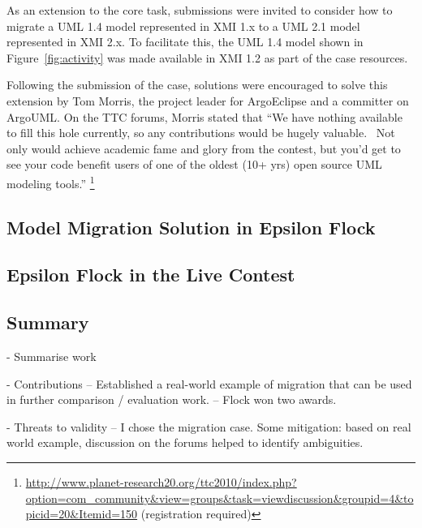 As an extension to the core task, submissions were invited to consider how to migrate a UML 1.4 model represented in XMI 1.x to a UML 2.1 model represented in XMI 2.x. To facilitate this, the UML 1.4 model shown in Figure~\ref{fig:activity} was made available in XMI 1.2 as part of the case resources.

Following the submission of the case, solutions were encouraged to solve this extension by Tom Morris, the project leader for ArgoEclipse and a committer on ArgoUML. On the TTC forums, Morris stated that ``We have nothing available to fill this hole currently, so any contributions would be hugely valuable.  Not only would achieve academic fame and glory from the contest, but you'd get to see your code benefit users of one of the oldest (10+ yrs) open source UML modeling tools.'' \footnote{\url{http://www.planet-research20.org/ttc2010/index.php?option=com_community&view=groups&task=viewdiscussion&groupid=4&topicid=20&Itemid=150} (registration required)}

\subsection{Model Migration Solution in Epsilon Flock}
\label{subsubsec:ttc_solution}

\subsection{Epsilon Flock in the Live Contest}
\label{subsubsec:ttc_live_contest}


\subsection{Summary}
- Summarise work

- Contributions
-- Established a real-world example of migration that can be used in further comparison / evaluation work.
-- Flock won two awards.

- Threats to validity
-- I chose the migration case. Some mitigation: based on real world example, discussion on the forums helped to identify ambiguities. 


